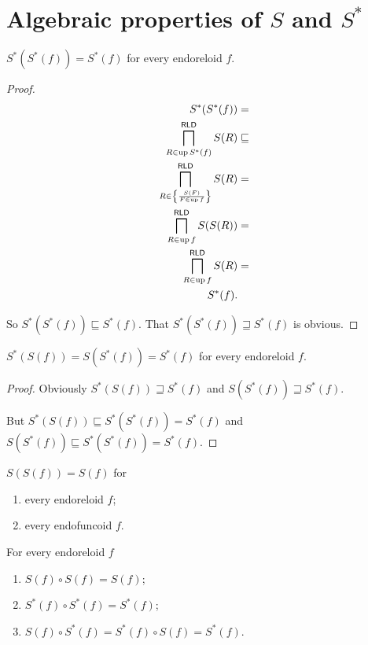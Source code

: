 \section{\texorpdfstring{Algebraic properties of $S$ and $S^{\ast}$}%
{Algebraic properties of S and S*}}
\begin{thm}
$S^{\ast}(S^{\ast}(f))=S^{\ast}(f)$ for every endoreloid $f$.\end{thm}
\begin{proof}
~
\begin{align*}
S^{\ast}(S^{\ast}(f)) & =\\
\bigsqcap_{R\in\operatorname{up} S^{\ast}(f)}^{\mathsf{RLD}}S(R) & \sqsubseteq\\
\bigsqcap_{R\in\left\{ \frac{S(F)}{F\in\operatorname{up} f}\right\}}^{\mathsf{RLD}}S(R) & =\\
\bigsqcap_{R\in\operatorname{up} f}^{\mathsf{RLD}}S(S(R)) & =\\
\bigsqcap_{R\in\operatorname{up} f}^{\mathsf{RLD}}S(R) & =\\
S^{\ast}(f).
\end{align*}


So $S^{\ast}(S^{\ast}(f))\sqsubseteq S^{\ast}(f)$. That $S^{\ast}(S^{\ast}(f))\sqsupseteq S^{\ast}(f)$
is obvious.\end{proof}
\begin{cor}
$S^{\ast}(S(f))=S(S^{\ast}(f))=S^{\ast}(f)$ for every endoreloid
$f$.\end{cor}
\begin{proof}
Obviously $S^{\ast}(S(f))\sqsupseteq S^{\ast}(f)$ and $S(S^{\ast}(f))\sqsupseteq S^{\ast}(f)$.

But $S^{\ast}(S(f))\sqsubseteq S^{\ast}(S^{\ast}(f))=S^{\ast}(f)$
and $S(S^{\ast}(f))\sqsubseteq S^{\ast}(S^{\ast}(f))=S^{\ast}(f)$.\end{proof}
\begin{conjecture}
$S(S(f))=S(f)$ for
\begin{enumerate}
\item every endoreloid $f$;
\item every endofuncoid $f$.
\end{enumerate}
\end{conjecture}

\begin{conjecture}
For every endoreloid $f$
\begin{enumerate}
\item $S(f)\circ S(f)=S(f)$;
\item $S^{\ast}(f)\circ S^{\ast}(f)=S^{\ast}(f)$;
\item $S(f)\circ S^{\ast}(f)=S^{\ast}(f)\circ S(f)=S^{\ast}(f)$.
\end{enumerate}
\end{conjecture}


